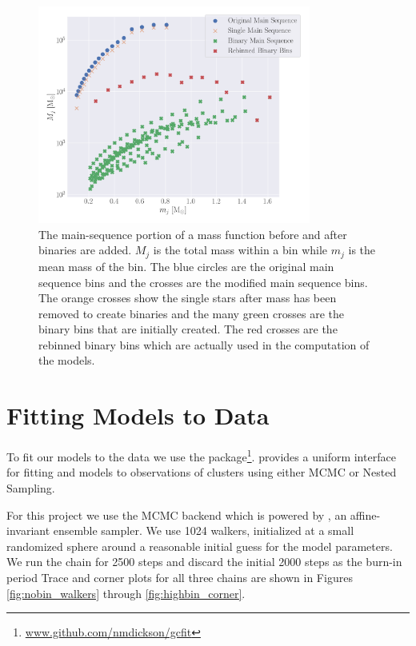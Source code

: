 \begin{figure}
    \centering
    \includegraphics[width=0.8\textwidth]{figures/shifted-mf.png}
    \caption{The main-sequence portion of a mass function before and after binaries are added. $M_j$
        is the total mass within a bin while $m_j$ is the mean mass of the bin. The blue circles are
the original main sequence bins and the crosses are the modified main sequence bins. The
orange crosses show the single stars after mass has been removed to create binaries and the
many green crosses are the binary bins that are initially created. The red crosses are the
        rebinned binary bins which are actually used in the computation of the 
        models.}
    \label{fig:2/shifted-mf}
\end{figure}



\section{Fitting Models to Data}


To fit our models to the data we use the 
package\footnote{\url{www.github.com/nmdickson/gcfit}}.  provides a uniform interface
for fitting \evolvemf{} and  models to observations of clusters using either MCMC or
Nested Sampling.

For this project we use the MCMC backend which is powered by 
\citet{Foreman-Mackey2013,Foreman-Mackey2019}, an affine-invariant ensemble  sampler. We use 1024
walkers, initialized at a small randomized sphere around a reasonable initial guess  for the model
parameters. We run the chain for 2500 steps and discard the initial 2000 steps as the burn-in period
Trace and corner \citep{Foreman-Mackey2016} plots for all three chains are shown in Figures
\ref{fig:nobin_walkers} through \ref{fig:highbin_corner}.

